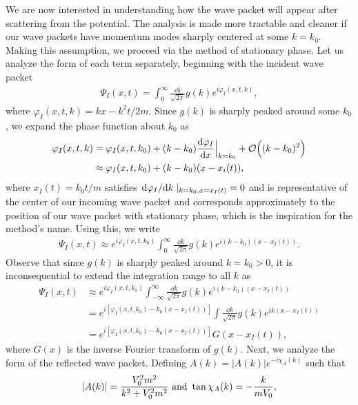 We are now interested in understanding how the wave packet will appear after scattering from the potential.
The analysis is made more tractable and cleaner if our wave packets have momentum modes sharply centered at some $k = k_0$.
Making this assumption, we proceed via the method of stationary phase.
Let us analyze the form of each term separately, beginning with the incident wave packet
\begin{align}
    \Psi_{I}(x,t) = \int_{0}^{\infty} \frac{\dd{k}}{\sqrt{2 \pi}} g(k) e^{i \varphi_{I}(x,t,k)}
,\end{align}
where $\varphi_{I}(x,t,k) = kx - k^2 t / 2m$.
Since $g(k)$ is sharply peaked around some $k_0$, we expand the phase function about $k_{0}$ as
\begin{align}
    \varphi_{I}(x,t,k) &= \varphi_{I}(x,t,k_0) + (k - k_0) \dv{\varphi_{I}}{x}\Big|_{k=k_0} + \mathcal{O}\Big( (k - k_0)^2 \Big) \nonumber \\
                       &\approx \varphi_{I}(x,t,k_0) + (k - k_0) (x - x_{i}(t))
,\end{align}
where $x_{I}(t) = k_0 t / m$ satisfies $\dv*{\varphi_{I}}{k}|_{k=k_0,x=x_{I}(t)} = 0$ and is representative of the center of our incoming wave packet and corresponds approximately to the position of our wave packet with stationary phase, which is the inspiration for the method's name.
Using this, we write
\begin{align}
    \Psi_{I}(x,t) \approx e^{i \varphi_{I}(x,t,k_{0})} \int_{0}^{\infty} \frac{\dd{k}}{\sqrt{2 \pi}} g(k) e^{i (k - k_0) (x - x_{I}(t))}
.\end{align}
Observe that since $g(k)$ is sharply peaked around $k = k_0 > 0$, it is inconsequential to extend the integration range to all $k$ as
\begin{align}
    \Psi_{I}(x,t) &\approx e^{i \varphi_{I}(x,t,k_0)} \int_{-\infty}^{\infty} \frac{\dd{k}}{\sqrt{2 \pi}} g(k) e^{i (k - k_0) (x - x_{I}(t))} \nonumber \\
                  &= e^{i [ \varphi_{I}(x,t,k_0) - k_0 (x - x_{I}(t)) ]} \int \frac{\dd{k}}{\sqrt{2 \pi}} g(k) e^{i k ( x - x_{I}(t) )} \nonumber \\
                  &= e^{i[\varphi_{I}(x,t,k_0) - k_0 (x - x_{I}(t))]} G(x - x_{I}(t))
,\end{align}
where $G(x)$ is the inverse Fourier transform of $g(k)$.
Next, we analyze the form of the reflected wave packet.
Defining $A(k) = |A(k)| e^{-i \chi_{A}(k)}$ such that
\begin{align}
    |A(k)| = \frac{V_0^2 m^2}{k^2 + V_0^2 m^2}~{\rm and}~\tan{\chi_{A}(k)} = -\frac{k}{m V_0}
,\end{align}
